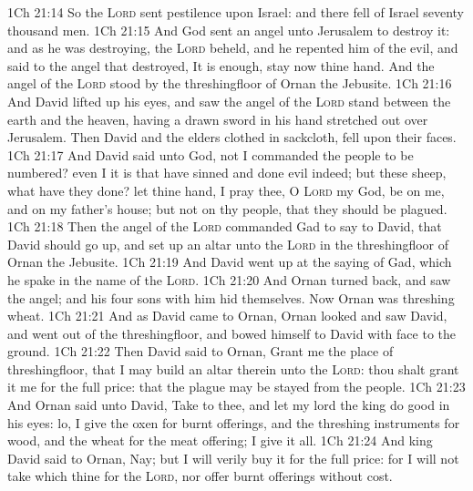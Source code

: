 \vs 1Ch 21:14 So the \textsc{Lord} sent pestilence upon Israel: and there fell of Israel seventy thousand men.
\vs 1Ch 21:15 And God sent an angel unto Jerusalem to destroy it: and as he was destroying, the \textsc{Lord} beheld, and he repented him of the evil, and said to the angel that destroyed, It is enough, stay now thine hand. And the angel of the \textsc{Lord} stood by the threshingfloor of Ornan the Jebusite.
\vs 1Ch 21:16 And David lifted up his eyes, and saw the angel of the \textsc{Lord} stand between the earth and the heaven, having a drawn sword in his hand stretched out over Jerusalem. Then David and the elders  clothed in sackcloth, fell upon their faces.
\vs 1Ch 21:17 And David said unto God,  not I  commanded the people to be numbered? even I it is that have sinned and done evil indeed; but  these sheep, what have they done? let thine hand, I pray thee, O \textsc{Lord} my God, be on me, and on my father's house; but not on thy people, that they should be plagued.
\vs 1Ch 21:18 Then the angel of the \textsc{Lord} commanded Gad to say to David, that David should go up, and set up an altar unto the \textsc{Lord} in the threshingfloor of Ornan the Jebusite.
\vs 1Ch 21:19 And David went up at the saying of Gad, which he spake in the name of the \textsc{Lord}.
\vs 1Ch 21:20 And Ornan turned back, and saw the angel; and his four sons with him hid themselves. Now Ornan was threshing wheat.
\vs 1Ch 21:21 And as David came to Ornan, Ornan looked and saw David, and went out of the threshingfloor, and bowed himself to David with  face to the ground.
\vs 1Ch 21:22 Then David said to Ornan, Grant me the place of  threshingfloor, that I may build an altar therein unto the \textsc{Lord}: thou shalt grant it me for the full price: that the plague may be stayed from the people.
\vs 1Ch 21:23 And Ornan said unto David, Take  to thee, and let my lord the king do  good in his eyes: lo, I give  the oxen  for burnt offerings, and the threshing instruments for wood, and the wheat for the meat offering; I give it all.
\vs 1Ch 21:24 And king David said to Ornan, Nay; but I will verily buy it for the full price: for I will not take  which  thine for the \textsc{Lord}, nor offer burnt offerings without cost.
